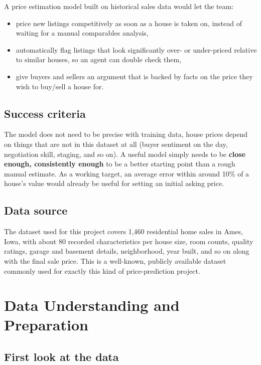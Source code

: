 \documentclass[11pt]{article}
\begin{document}
A price estimation model built on historical sales data would let the team:

\begin{itemize}[noitemsep]
    \item price new listings competitively as soon as a house is taken on, instead of
    waiting for a manual comparables analysis,
    \item automatically flag listings that look significantly over- or under-priced
    relative to similar houses, so an agent can double check them,
    \item give buyers and sellers an argument that is backed by facts on the price they wish to buy/sell a house for.
\end{itemize}

\subsection{Success criteria}

The model does not need to be precise with training data, house prices depend on things that are not in
this dataset at all (buyer sentiment on the day, negotiation skill, staging, and so
on). A useful model simply needs to be \textbf{close enough, consistently enough} to
be a better starting point than a rough manual estimate. As a working target, an
average error within around 10\% of a house's value would already be useful for
setting an initial asking price.

\subsection{Data source}

The dataset used for this project covers 1,460 residential home sales in Ames, Iowa,
with about 80 recorded characteristics per house  size, room counts, quality
ratings, garage and basement details, neighborhood, year built, and so on  along
with the final sale price. This is a well-known, publicly available dataset commonly
used for exactly this kind of price-prediction project.

\section{Data Understanding and Preparation}

\subsection{First look at the data}
\end{document}
